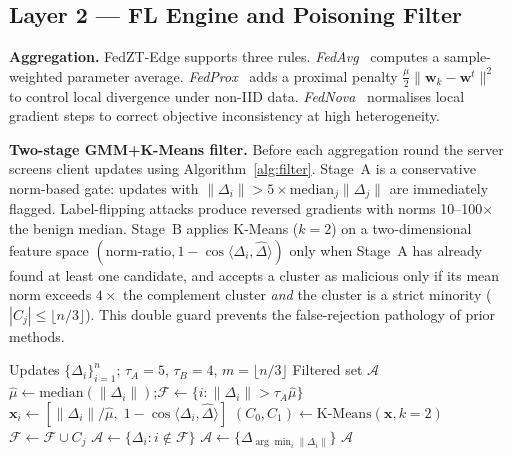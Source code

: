\documentclass[sn-mathphys,Numbered]{sn-jnl}
\begin{document}
\subsection{Layer 2 --- FL Engine and Poisoning Filter}\label{sec:layer2}
\textbf{Aggregation.} FedZT-Edge supports three rules. \textit{FedAvg}~\cite{mcmahan2017} computes a sample-weighted parameter average. \textit{FedProx}~\cite{li2020fedprox} adds a proximal penalty $\tfrac{\mu}{2}\|\mathbf{w}_k-\mathbf{w}^t\|^2$ to control local divergence under non-IID data. \textit{FedNova}~\cite{wang2020fednova} normalises local gradient steps to correct objective inconsistency at high heterogeneity.

\textbf{Two-stage GMM+K-Means filter.} Before each aggregation round the server screens client updates using Algorithm~\ref{alg:filter}. Stage~A is a conservative norm-based gate: updates with $\|\Delta_i\| > 5\times\text{median}_j\|\Delta_j\|$ are immediately flagged. Label-flipping attacks produce reversed gradients with norms 10--100$\times$ the benign median. Stage~B applies K-Means ($k=2$) on a two-dimensional feature space $(\text{norm-ratio}, 1-\cos\langle\Delta_i,\hat\Delta\rangle)$ only when Stage~A has already found at least one candidate, and accepts a cluster as malicious only if its mean norm exceeds $4\times$ the complement cluster \emph{and} the cluster is a strict minority ($|C_j|\le\lfloor n/3\rfloor$). This double guard prevents the false-rejection pathology of prior methods.

\begin{algorithm}[t]
\caption{Two-Stage GMM+K-Means Update Filter}\label{alg:filter}
\begin{algorithmic}[1]
\Require Updates $\{\Delta_i\}_{i=1}^n$;\; $\tau_A{=}5$,\; $\tau_B{=}4$,\; $m{=}\lfloor n/3\rfloor$
\Ensure Filtered set $\mathcal{A}$
\State $\hat{\mu}\!\leftarrow\!\text{median}(\|\Delta_i\|)$;\quad $\mathcal{F}\!\leftarrow\!\{i:\|\Delta_i\|{>}\tau_A\hat\mu\}$ 
  \State $\mathbf{x}_i\!\leftarrow\![\|\Delta_i\|/\hat\mu,\; 1{-}\cos\!\langle\Delta_i,\hat\Delta\rangle]$
  \State $(C_0,C_1)\!\leftarrow\!\text{K-Means}(\mathbf{x},k{=}2)$
      \State $\mathcal{F}\!\leftarrow\!\mathcal{F}\cup C_j$ 
    \EndIf
  \EndFor
\EndIf
\State $\mathcal{A}\!\leftarrow\!\{\Delta_i:i\notin\mathcal{F}\}$
 $\mathcal{A}\!\leftarrow\!\{\Delta_{\arg\min_i\|\Delta_i\|}\}$
\EndIf
\State\Return $\mathcal{A}$
\end{algorithmic}
\end{algorithm}
\end{document}
